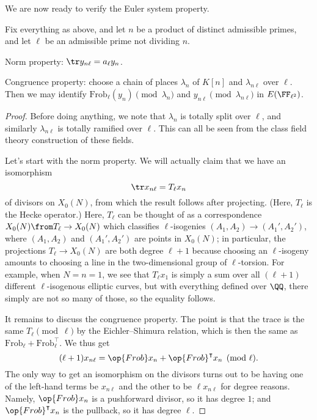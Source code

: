 \documentclass[../notes.tex]{subfiles}
\begin{document}
We are now ready to verify the Euler system property.
\begin{proposition} \label{prop:euler-system-prop}
	Fix everything as above, and let $n$ be a product of distinct admissible primes, and let $\ell$ be an admissible prime not dividing $n$.
	\begin{listalph}
		\item Norm property: $\tr y_{n\ell}=a_\ell y_n$.
		\item Congruence property: choose a chain of places $\lambda_n$ of $K[n]$ and $\lambda_{n\ell}$ over $\ell$. Then we may identify $\mathrm{Frob}_\ell(y_n)\pmod{\lambda_n}$ and $y_{n\ell}\pmod{\lambda_{n\ell}}$ in $E(\FF_{\ell^2})$.
	\end{listalph}
\end{proposition}
\begin{proof}
	Before doing anything, we note that $\lambda_n$ is totally split over $\ell$, and similarly $\lambda_{n\ell}$ is totally ramified over $\ell$. This can all be seen from the class field theory construction of these fields.

	Let's start with the norm property. We will actually claim that we have an isomorphism
	\[\tr x_{n\ell}=T_\ell x_n\]
	of divisors on $X_0(N)$, from which the result follows after projecting. (Here, $T_\ell$ is the Hecke operator.) Here, $T_\ell$ can be thought of as a correspondence $X_0(N)\from T_\ell\to X_0(N)$ which classifies $\ell$-isogenies $(A_1,A_2)\to(A_1',A_2')$, where $(A_1,A_2)$ and $(A_1',A_2')$ are points in $X_0(N)$; in particular, the projections $T_\ell\to X_0(N)$ are both degree $\ell+1$ because choosing an $\ell$-isogeny amounts to choosing a line in the two-dimensional group of $\ell$-torsion. For example, when $N=n=1$, we see that $T_\ell x_1$ is simply a sum over all $(\ell+1)$ different $\ell$-isogenous elliptic curves, but with everything defined over $\QQ$, there simply are not so many of those, so the equality follows.

	It remains to discuss the congruence property. The point is that the trace is the same $T_\ell\pmod\ell$ by the Eichler--Shimura relation, which is then the same as $\mathrm{Frob}_\ell+\mathrm{Frob}_\ell^\intercal$. We thus get
	\[(\ell+1)x_{n\ell}=\op{Frob}x_n+\op{Frob}^\intercal x_n\pmod\ell.\]
	The only way to get an isomorphism on the divisors turns out to be having one of the left-hand terms be $x_{n\ell}$ and the other to be $\ell x_{n\ell}$ for degree reasons. Namely, $\op{Frob}x_n$ is a pushforward divisor, so it has degree $1$; and $\op{Frob}^\intercal x_n$ is the pullback, so it has degree $\ell$.
\end{proof}
\end{document}
